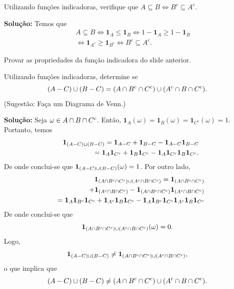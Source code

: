 \begin{frame}
\begin{exem}
	Utilizando funções indicadoras, verifique que $A\subseteq
	B\Leftrightarrow B^c\subseteq A^c$.
	
	{\bf Solução:} Temos que
	\begin{eqnarray}
	& & A\subseteq B\Leftrightarrow \mathbf{1}_A\leq \mathbf{1}_B\Leftrightarrow 1-\mathbf{1}_A\geq 1-\mathbf{1}_B \nonumber \\
	& & \Leftrightarrow \mathbf{1}_{A^c}\geq \mathbf{1}_{B^c}\Leftrightarrow B^c\subseteq A^c.\nonumber
	\end{eqnarray}
\end{exem}	

\begin{exer}
	Provar as propriedades da função indicadora do slide anterior.
\end{exer}

\begin{exem}

	Utilizando funções indicadoras, determine se $$(A-C)\cup
	(B-C)=(A\cap B^c\cap C^c)\cup (A^c\cap B\cap C^c).$$
	(Sugestão: Faça um Diagrama de Venn.)


\end{exem}
\end{frame}

\begin{frame}
	{\bf Solução:} Seja $\omega\in A\cap B\cap C^c$. Então,
	$\mathbf{1}_A(\omega)=\mathbf{1}_B(\omega)=\mathbf{1}_{C^c}(\omega)=1$. Portanto, temos
	\begin{eqnarray}
	& & \mathbf{1}_{(A-C)\cup
		(B-C)}=\mathbf{1}_{A-C}+\mathbf{1}_{B-C}-\mathbf{1}_{A-C}\mathbf{1}_{B-C} \nonumber \\
	& & =\mathbf{1}_A\mathbf{1}_{C^c}+\mathbf{1}_B\mathbf{1}_{C^c}-\mathbf{1}_A\mathbf{1}_{C^c}\mathbf{1}_B\mathbf{1}_{C^c}.\nonumber
	\end{eqnarray}
	De onde conclui-se que $\mathbf{1}_{(A-C)\cup (B-C)}(\omega)=1$. Por outro
	lado,
	\begin{eqnarray}
	& & \mathbf{1}_{(A\cap B^c\cap C^c)\cup (A^c\cap B\cap
		C^c)}=\mathbf{1}_{(A\cap B^c\cap C^c)}\nonumber
	\\
	& &+\mathbf{1}_{(A^c\cap B\cap
		C^c)}-\mathbf{1}_{(A\cap B^c\cap C^c)}\mathbf{1}_{(A^c\cap B\cap C^c)}
	\nonumber
	\\
	& &
	=\mathbf{1}_A\mathbf{1}_{B^c}\mathbf{1}_{C^c}+\mathbf{1}_{A^c}\mathbf{1}_B\mathbf{1}_{C^c}-\mathbf{1}_A\mathbf{1}_{B^c}\mathbf{1}_{C^c}\mathbf{1}_{A^c}\mathbf{1}_B\mathbf{1}_{C^c}\nonumber
	\end{eqnarray}
	De onde conclui-se que $$\mathbf{1}_{(A\cap B^c\cap C^c)\cup (A^c\cap
		B\cap C^c)}(\omega)=0.$$ Logo, $$\mathbf{1}_{(A-C)\cup (B-C)}\ne
	\mathbf{1}_{(A\cap B^c\cap C^c)\cup (A^c\cap B\cap C^c)},$$ o que
	implica que $$(A-C)\cup (B-C)\ne (A\cap B^c\cap C^c)\cup
	(A^c\cap B\cap C^c).$$

\end{frame}


